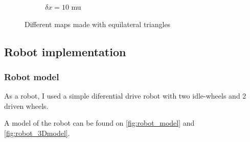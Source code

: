 \documentclass[../main.tex]{subfiles}
\begin{document}
\begin{figure}[H]
\begin{subfigure}{0.3\textwidth}
        \caption{$\delta x = 10$ mu}
		\label{fig:real_map_10}
    \end{subfigure}
    \caption{Different maps made with equilateral triangles}
    \label{fig:three_map_example}
\end{figure}

\tobedone


\subsection{Robot implementation}

\subsubsection{Robot model}

As a robot, I used a simple diferential drive robot with two idle-wheels and 2 driven wheels.

A model of the robot can be found on \autoref{fig:robot_model} and \autoref{fig:robot_3Dmodel}.
\end{document}
